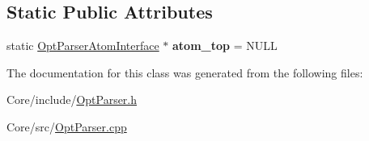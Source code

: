 \subsection*{Static Public Attributes}
\begin{DoxyCompactItemize}
\item 
\hypertarget{classskl_1_1_opt_parser_atom_interface_a5578648ddb5d70b020e126adc523d202}{}\label{classskl_1_1_opt_parser_atom_interface_a5578648ddb5d70b020e126adc523d202} 
static \hyperlink{classskl_1_1_opt_parser_atom_interface}{Opt\+Parser\+Atom\+Interface} $\ast$ {\bfseries atom\+\_\+top} = N\+U\+LL
\end{DoxyCompactItemize}


The documentation for this class was generated from the following files\+:\begin{DoxyCompactItemize}
\item 
Core/include/\hyperlink{_opt_parser_8h}{Opt\+Parser.\+h}\item 
Core/src/\hyperlink{_opt_parser_8cpp}{Opt\+Parser.\+cpp}\end{DoxyCompactItemize}
